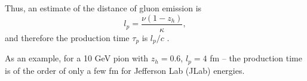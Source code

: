     Thus, an estimate of the distance of gluon emission is
    \begin{equation*}
        l_p = \frac{\nu(1 - z_h)}{\kappa},
    \end{equation*}
    and therefore the production time $\tau_p$ is $l_p/c$ \cite{kopeliovich2004}.

    As an example, for a 10 GeV pion with $z_h = 0.6$, $l_p = 4$ fm -- the production time is of the order of only a few fm for Jefferson Lab (JLab) energies.
